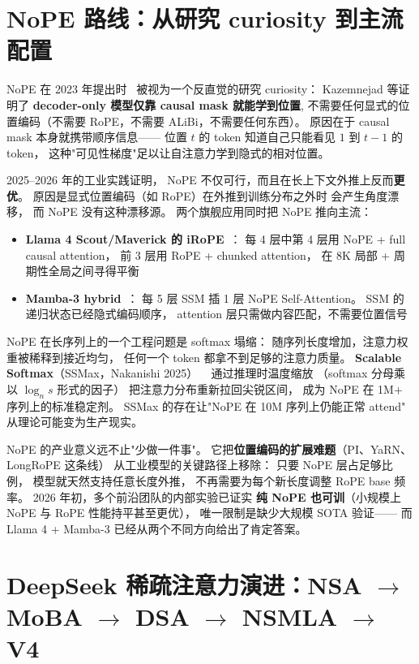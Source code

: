 \section{NoPE 路线：从研究 curiosity 到主流配置}
\label{sec:nope-route}

NoPE 在 2023 年提出时~\cite{kazemnejad2023nope}
被视为一个反直觉的研究 curiosity：
Kazemnejad 等证明了
\textbf{decoder-only 模型仅靠 causal mask 就能学到位置},
不需要任何显式的位置编码（不需要 RoPE，不需要 ALiBi，不需要任何东西）。
原因在于 causal mask 本身就携带顺序信息——
位置 $t$ 的 token 知道自己只能看见 $1$ 到 $t-1$ 的 token，
这种"可见性梯度"足以让自注意力学到隐式的相对位置。

2025--2026 年的工业实践证明，
NoPE 不仅可行，而且在长上下文外推上反而\textbf{更优}。
原因是显式位置编码（如 RoPE）在外推到训练分布之外时
会产生角度漂移，
而 NoPE 没有这种漂移源。
两个旗舰应用同时把 NoPE 推向主流：
\begin{itemize}[noitemsep]
  \item \textbf{Llama 4 Scout/Maverick 的 iRoPE}~\cite{llama4irope2026}：
        每 4 层中第 4 层用 NoPE + full causal attention，
        前 3 层用 RoPE + chunked attention，
        在 8K 局部 + 周期性全局之间寻得平衡
  \item \textbf{Mamba-3 hybrid}~\cite{mamba3hybrid2026}：
        每 5 层 SSM 插 1 层 NoPE Self-Attention。
        SSM 的递归状态已经隐式编码顺序，
        attention 层只需做内容匹配，不需要位置信号
\end{itemize}

NoPE 在长序列上的一个工程问题是 softmax 塌缩：
随序列长度增加，注意力权重被稀释到接近均匀，
任何一个 token 都拿不到足够的注意力质量。
\textbf{Scalable Softmax}（SSMax，Nakanishi 2025）
~\cite{nakanishi2025ssmax}
通过推理时温度缩放
（softmax 分母乘以 $\log_n s$ 形式的因子）
把注意力分布重新拉回尖锐区间，
成为 NoPE 在 1M+ 序列上的标准稳定剂。
SSMax 的存在让"NoPE 在 10M 序列上仍能正常 attend"
从理论可能变为生产现实。

NoPE 的产业意义远不止"少做一件事"。
它把\textbf{位置编码的扩展难题}（PI、YaRN、LongRoPE 这条线）
从工业模型的关键路径上移除：
只要 NoPE 层占足够比例，
模型就天然支持任意长度外推，
不再需要为每个新长度调整 RoPE base 频率。
2026 年初，多个前沿团队的内部实验已证实
\textbf{纯 NoPE 也可训}（小规模上 NoPE 与 RoPE 性能持平甚至更优），
唯一限制是缺少大规模 SOTA 验证——
而 Llama 4 + Mamba-3 已经从两个不同方向给出了肯定答案。

\section{DeepSeek 稀疏注意力演进：NSA $\to$ MoBA $\to$ DSA $\to$ NSMLA $\to$ V4}
\label{sec:deepseek-sparse-attention}

